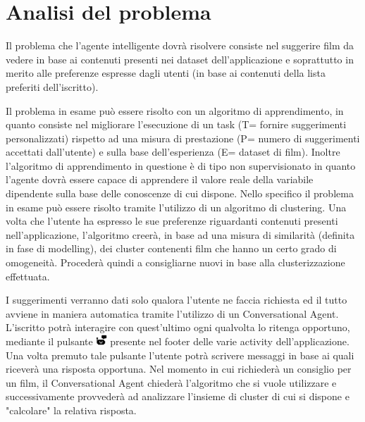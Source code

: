 \documentclass[a4paper, 10pt]{report}
\begin{document}
        \section{Analisi del problema}\label{sec:analisi-del-problema}

            Il problema che l'agente intelligente dovrà risolvere consiste nel suggerire film da vedere in base ai contenuti
            presenti nei dataset dell'applicazione e soprattutto in merito alle preferenze espresse dagli utenti (in base ai
            contenuti della lista preferiti dell'iscritto).

            Il problema in esame può essere risolto con un algoritmo di apprendimento, in quanto consiste nel migliorare l'esecuzione
            di un task (T= fornire suggerimenti personalizzati) rispetto ad una misura di prestazione (P= numero di suggerimenti accettati
            dall'utente) e sulla base dell'esperienza (E= dataset di film). Inoltre l'algoritmo di apprendimento
            in questione è di tipo non supervisionato in quanto l'agente dovrà essere capace di apprendere il valore reale della
            variabile dipendente sulla base delle conoscenze di cui dispone.
            Nello specifico il problema in esame può essere risolto tramite l'utilizzo di un algoritmo di clustering. Una volta che l'utente
            ha espresso le sue preferenze riguardanti contenuti presenti nell'applicazione, l'algoritmo creerà, in base ad una misura di similarità
            (definita in fase di modelling), dei cluster contenenti film che hanno un certo grado di omogeneità. Procederà quindi a consigliarne nuovi
            in base alla clusterizzazione effettuata.

            I suggerimenti verranno dati solo qualora l'utente ne faccia richiesta ed il tutto avviene in maniera automatica tramite l'utilizzo
            di un Conversational Agent. L'iscritto potrà interagire con quest'ultimo ogni qualvolta lo ritenga opportuno,
            mediante il pulsante \includegraphics[width=0.4cm]{deployment/icona_chatbot.png} presente nel footer delle varie activity dell'applicazione.
            Una volta premuto tale pulsante l'utente potrà scrivere messaggi in base ai quali riceverà una risposta opportuna.
            Nel momento in cui richiederà un consiglio per un film, il Conversational Agent chiederà l'algoritmo che si vuole utilizzare e
            successivamente provvederà ad analizzare l'insieme di cluster di cui si dispone e "calcolare" la relativa risposta.
\end{document}
